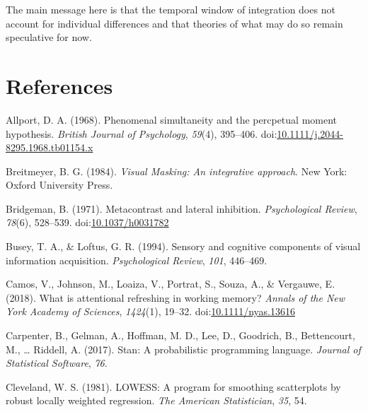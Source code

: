 \documentclass[
  ,man]{apa6}
\newlength{\cslhangindent}
\newlength{\cslentryspacingunit} %
\newenvironment{CSLReferences}[2] %
 {%
  \setlength{\parindent}{0pt}
  \ifodd #1
  \let\oldpar\par
  \def\par{\hangindent=\cslhangindent\oldpar}
  \fi
  \setlength{\parskip}{#2\cslentryspacingunit}
 }%
 {}
\begin{document}
The main message here is that the temporal window of integration does not account for individual differences and that theories of what may do so remain speculative for now.

\newpage

\hypertarget{references}{%
\section*{References}\label{references}}

\hypertarget{refs}{}
\begin{CSLReferences}{1}{0}
\leavevmode{}%
Allport, D. A. (1968). Phenomenal simultaneity and the percpetual moment hypothesis. \emph{British Journal of Psychology}, \emph{59}(4), 395--406. doi:\href{https://doi.org/10.1111/j.2044-8295.1968.tb01154.x}{10.1111/j.2044-8295.1968.tb01154.x}

\leavevmode{}%
Breitmeyer, B. G. (1984). \emph{Visual {Masking}: {An} integrative approach}. New York: Oxford University Press.

\leavevmode{}%
Bridgeman, B. (1971). Metacontrast and lateral inhibition. \emph{Psychological Review}, \emph{78}(6), 528--539. doi:\href{https://doi.org/10.1037/h0031782}{10.1037/h0031782}

\leavevmode{}%
Busey, T. A., \& Loftus, G. R. (1994). Sensory and cognitive components of visual information acquisition. \emph{Psychological Review}, \emph{101}, 446--469.

\leavevmode{}%
Camos, V., Johnson, M., Loaiza, V., Portrat, S., Souza, A., \& Vergauwe, E. (2018). What is attentional refreshing in working memory? \emph{Annals of the New York Academy of Sciences}, \emph{1424}(1), 19--32. doi:\href{https://doi.org/10.1111/nyas.13616}{10.1111/nyas.13616}

\leavevmode{}%
Carpenter, B., Gelman, A., Hoffman, M. D., Lee, D., Goodrich, B., Bettencourt, M., \ldots{} Riddell, A. (2017). Stan: {A} probabilistic programming language. \emph{Journal of Statistical Software}, \emph{76}.

\leavevmode{}%
Cleveland, W. S. (1981). {LOWESS}: {A} program for smoothing scatterplots by robust locally weighted regression. \emph{The American Statistician}, \emph{35}, 54.


\end{CSLReferences}
\end{document}
